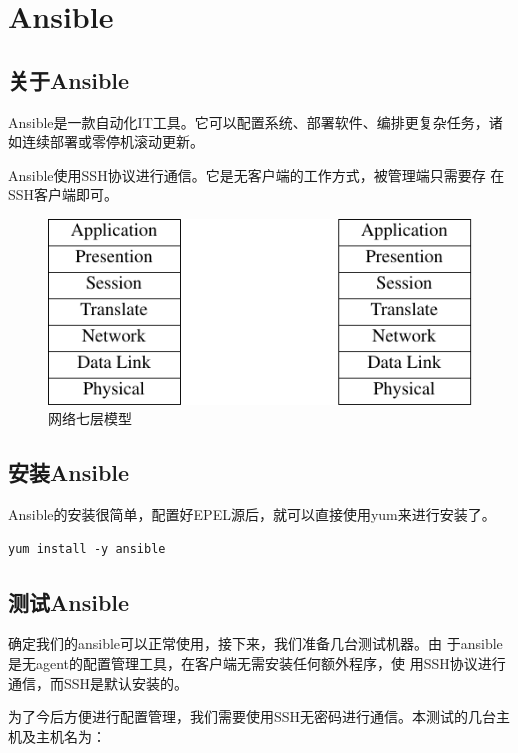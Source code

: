 \chapter{Ansible}
\label{chap:Ansible}

\section{关于Ansible}
\label{sec:AboutAnsible}

Ansible是一款自动化IT工具。它可以配置系统、部署软件、编排更复杂任务，诸
如连续部署或零停机滚动更新。

Ansible使用SSH协议进行通信。它是无客户端的工作方式，被管理端只需要存
在SSH客户端即可。

\begin{figure}[hbtp]
  \centering
  \includegraphics{graph/network01.pdf}
  \caption{网络七层模型}
\end{figure}

\section{安装Ansible}
\label{sec:InstallAnsible}

Ansible的安装很简单，配置好EPEL源后，就可以直接使用yum来进行安装了。

\begin{verbatim}
yum install -y ansible
\end{verbatim}

\section{测试Ansible}

确定我们的ansible可以正常使用，接下来，我们准备几台测试机器。由
于ansible是无agent的配置管理工具，在客户端无需安装任何额外程序，使
用SSH协议进行通信，而SSH是默认安装的。

为了今后方便进行配置管理，我们需要使用SSH无密码进行通信。本测试的几台主
机及主机名为：

